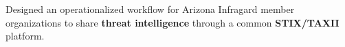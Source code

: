 


\begin{rExperience}

  \item Designed an operationalized workflow for Arizona Infragard member organizations to share \textbf{threat intelligence} through a common \textbf{STIX/TAXII} platform.


\end{rExperience}
